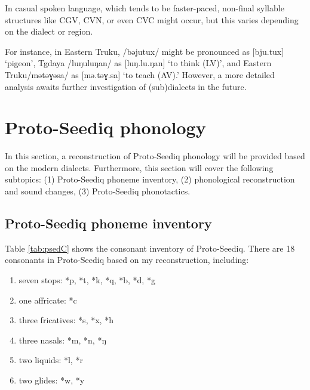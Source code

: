 \documentclass[12pt]{article}
\newcommand{\psedf}{Proto-Seediq\xspace}
\newcommand{\stgf}{Tgdaya\xspace}
\newcommand{\setrf}{Eastern Truku\xspace}
\begin{document}
In casual spoken language, which tends to be faster-paced, non-final syllable structures like CGV, CVN, or even CVC might occur, but this varies depending on the dialect or region.

For instance, in \setrf, /bəjutux/ might be pronounced as [bju.tux] `pigeon', \stgf 
 /luŋuluŋan/ as [luŋ.lu.ŋan] `to think (LV)', and \setrf /mətəɣəsa/ as [mə.təɣ.sa] `to teach (AV).' However, a more detailed analysis awaits further investigation of (sub)dialects in the future.

\section{Proto-Seediq phonology}

In this section, a reconstruction of \psedf phonology will be provided based on the modern dialects. Furthermore, this section will cover the following subtopics: (1) \psedf phoneme inventory, (2) phonological reconstruction and sound changes, (3) \psedf phonotactics. 

\subsection{Proto-Seediq phoneme inventory} \label{psedphoin}

Table \ref{tab:psedC} shows the consonant inventory of \psedf. There are 18 consonants in \psedf based on my reconstruction, including:

\begin{enumerate}[label=(\roman*), itemsep=0pt, topsep=0pt]
    \item seven stops: *p, *t, *k, *q, *b, *d, *g
    \item one affricate: *c
    \item three fricatives: *s, *x, *h
    \item three nasals: *m, *n, *ŋ
    \item two liquids: *l, *r
    \item two glides: *w, *y
\end{enumerate}
\end{document}
